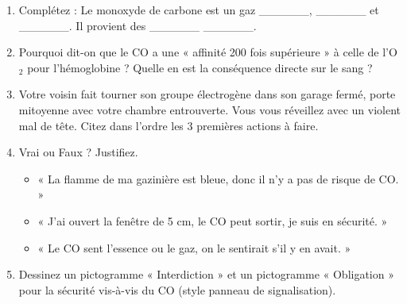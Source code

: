 \documentclass[11pt]{article}
\begin{document}
\begin{exercice}
\begin{enumerate}
    \item Complétez : Le monoxyde de carbone est un gaz \_\_\_\_\_\_, \_\_\_\_\_\_ et \_\_\_\_\_\_. Il provient des \_\_\_\_\_\_ \_\_\_\_\_\_.
    \item Pourquoi dit-on que le CO a une « affinité 200 fois supérieure » à celle de l'O$_2$ pour l'hémoglobine ? Quelle en est la conséquence directe sur le sang ?
    \item Votre voisin fait tourner son groupe électrogène dans son garage fermé, porte mitoyenne avec votre chambre entrouverte. Vous vous réveillez avec un violent mal de tête. Citez dans l'ordre les 3 premières actions à faire.
    \item Vrai ou Faux ? Justifiez.
    \begin{itemize}
        \item[a)] « La flamme de ma gazinière est bleue, donc il n'y a pas de risque de CO. »
        \item[b)] « J'ai ouvert la fenêtre de 5 cm, le CO peut sortir, je suis en sécurité. »
        \item[c)] « Le CO sent l'essence ou le gaz, on le sentirait s'il y en avait. »
    \end{itemize}
    \item Dessinez un pictogramme « Interdiction » et un pictogramme « Obligation » pour la sécurité vis-à-vis du CO (style panneau de signalisation).
\end{enumerate}
\end{exercice}
\end{document}

